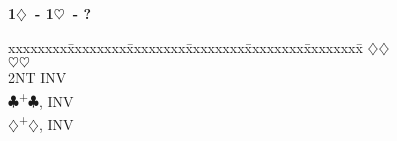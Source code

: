 \documentclass[10pt]{article}
\renewcommand{\c}{$\clubsuit$}
\renewcommand{\d}{$\diamondsuit$}
\newcommand{\h}{$\heartsuit$}
\newcommand{\s}{$\spadesuit$}
\newcommand{\p}{\textsuperscript{+}}
\newcommand{\m}{\textsuperscript{\textminus}}
\newenvironment{bidtable}[1][]
{\textbf{#1}
  \begin{adjustwidth}{1em}{}
    \addvspace{2pt}
    \begin{tabbing}
      xxxxxxxx\=xxxxxxxx\=xxxxxxxx\=xxxxxxxx\=xxxxxxxx\=xxxxxxxx\=\kill}
{\end{tabbing}\end{adjustwidth}\bigskip}%
\begin{document}
\begin{multicols*}{2}
\begin{bidtable}[1\d\ - 1\h\ - ?]
     \>      \d {}\d                              \\
     \>      \h {}\h                              \\
     \> 2NT  \> INV                                     \\
     \c  {}\p\c, INV                              \\
     \d  {}\p\d, INV                              %
\end{bidtable}


\end{multicols*}
\end{document}
